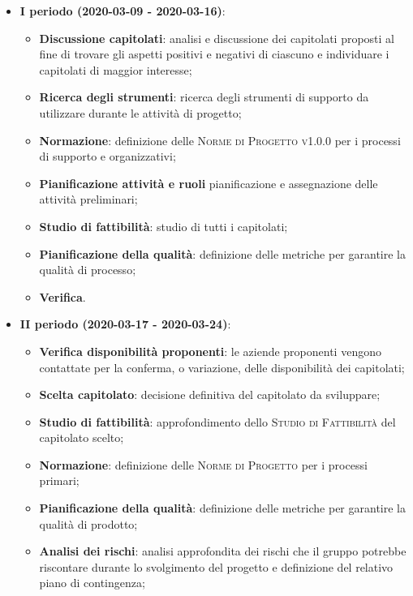 \documentclass[../piano-di-progetto.tex]{subfiles}
\begin{document}
\begin{itemize}

    \item \textbf{I periodo (2020-03-09 - 2020-03-16)}:
        \begin{itemize}
            \item \textbf{Discussione capitolati}: analisi e discussione dei capitolati proposti al fine di trovare gli aspetti positivi e negativi di ciascuno e individuare i capitolati di maggior interesse;
            \item \textbf{Ricerca degli strumenti}: ricerca degli strumenti di supporto da utilizzare durante le attività di progetto;
            \item \textbf{Normazione}: definizione delle \textsc{Norme di Progetto v1.0.0} per i processi di supporto e organizzativi;
            \item \textbf{Pianificazione attività e ruoli} pianificazione e assegnazione delle attività preliminari;
            \item \textbf{Studio di fattibilità}: studio di tutti i capitolati;
            \item \textbf{Pianificazione della qualità}: definizione delle metriche per garantire la qualità di processo;
            \item \textbf{Verifica}.
        \end{itemize}
        \item \textbf{II periodo (2020-03-17 - 2020-03-24)}:
            \begin{itemize}
                \item \textbf{Verifica disponibilità proponenti}: le aziende proponenti vengono contattate per la conferma, o variazione, delle disponibilità dei capitolati;
                \item \textbf{Scelta capitolato}: decisione definitiva del capitolato da sviluppare;
                \item \textbf{Studio di fattibilità}: approfondimento dello \textsc{Studio di Fattibilità} del capitolato scelto;
                \item \textbf{Normazione}: definizione delle \textsc{Norme di Progetto} per i processi primari;
                \item \textbf{Pianificazione della qualità}: definizione delle metriche per garantire la qualità di prodotto;
                \item \textbf{Analisi dei rischi}: analisi approfondita dei rischi che il gruppo potrebbe riscontare durante lo svolgimento del progetto e definizione del relativo piano di contingenza;

\end{itemize}
\end{itemize}
\end{document}
